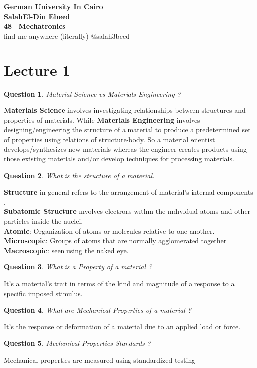 \documentclass[13]{article}
\newtheorem{exer}{Question}
\begin{document}
\begin{center}

{\LARGE \textbf{German University In Cairo
	\\ SalahEl-Din Ebeed 
	\\ 48-- Mechatronics
}
\\}  find me anywhere (literally) @salah3beed
\end{center}
\section{Lecture 1}
\begin{exer}
Material Science vs Materials Engineering ?
\end{exer}
\textbf{Materials Science} involves investigating relationships between structures and properties of materials. While \textbf{Materials Engineering} involves designing/engineering the structure of a material to produce a predetermined set of properties using relations of structure-body. So a material scientist   develops/synthesizes new materials whereas the engineer creates products using those existing materials and/or develop techniques for processing materials.
\begin{exer}
What is the structure of a material.
\end{exer}
\textbf{Structure} in general refers to the arrangement of material's internal components . \\
\textbf{Subatomic Structure} involves electrons within the individual atoms and other particles inside the nuclei.\\
\textbf{Atomic}: Organization of atoms or molecules relative  to one another. \\
\textbf{Microscopic}: Groups of atoms that are normally agglomerated together\\
\textbf{Macroscopic}: seen using the naked eye.
\begin{exer}
What is a Property of a material ?
\end{exer}
It's a material's trait in terms of the kind and magnitude of a response to a specific imposed stimulus. 
\begin{exer}
What are Mechanical Properties of a material ?
\end{exer}
It's the response or deformation of a material due to an applied load or force.
\begin{exer}
Mechanical Properties Standards ?
\end{exer}
Mechanical properties are measured using standardized testing
\end{document}
